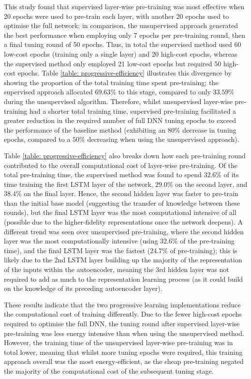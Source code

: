\documentclass[a4paper, 11pt]{report}
\begin{document}
    This study found that supervised layer-wise pre-training was most effective when 20 epochs were used to pre-train each layer, with another 20 epochs used to optimise the full network; in comparison, the unsupervised approach generated the best performance when employing only 7 epochs per pre-training round, then a final tuning round of 50 epochs. Thus, in total the supervised method used 60 low-cost epochs (training only a single layer) and 20 high-cost epochs, whereas the supervised method only employed 21 low-cost epochs but required 50 high-cost epochs. Table \ref{table: progressive-efficiency} illustrates this divergence by showing the proportion of the total training time spent pre-training; the supervised approach allocated $69.63\%$ to this stage, compared to only $33.59\%$ during the unsupervised algorithm. Therefore, whilst unsupervised layer-wise pre-training had a shorter total training time, supervised pre-training facilitated a greater reduction in the required number of full DNN tuning epochs to exceed the performance of the baseline method (exhibiting an $80\%$ decrease in tuning epochs, compared to a $50\%$ decreasing when using the unsupervised approach).

    Table \ref{table: progressive-efficiency} also breaks down how each pre-training round contributed to the overall computational cost of layer-wise pre-training. Of the total pre-training time, the supervised method was found to spend $32.6\%$ of its time training the first LSTM layer of the network, $29.0\%$ on the second layer, and $38.4\%$ on the final layer. Hence, the second hidden layer was faster to pre-train than the initial base model (suggesting the transfer of knowledge between these rounds), but the final LSTM layer was the most computational intensive of all (possible due to the higher-fidelity representations once the network deepens). A different trend was seen over unsupervised pre-training, where the second hidden layer was the most computationally intensive (using $32.6\%$ of the pre-training time), and the final LSTM layer was the fastest ($24.7\%$ of pre-training); this is likely due to the 2nd LSTM layer building up the majority of the representation of the inputs within the autoencoder, meaning the 3rd hidden layer was not required to add as much to the representation learning process (as it could build on the knowledge of its preceding autoencoder layer).

    These results indicate that the two progressive learning implementations reduce the computational cost of training differently. Due to the fewer high-cost epochs required to optimise the full DNN, the tuning round after supervised layer-wise pre-training was less energy intensive than when using the unsupervised method. However, the training time of the unsupervised layer-wise pre-training was in total lower, meaning that whilst more tuning epochs were required, this training approach overall was the most energy-efficient, as the cheap pre-training negated the majority of the computational cost of the subsequent tuning stage.
\end{document}
